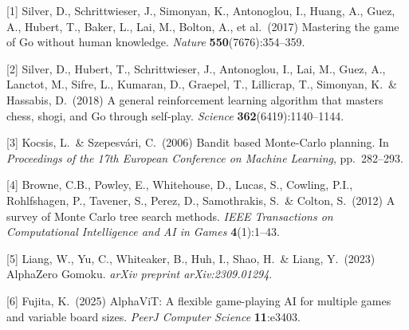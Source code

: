 \documentclass{article}
\begin{document}
{\small

[1] Silver, D., Schrittwieser, J., Simonyan, K., Antonoglou, I., Huang, A., Guez, A., Hubert, T., Baker, L., Lai, M., Bolton, A., et al.\ (2017) Mastering the game of Go without human knowledge. {\it Nature} {\bf 550}(7676):354--359.

[2] Silver, D., Hubert, T., Schrittwieser, J., Antonoglou, I., Lai, M., Guez, A., Lanctot, M., Sifre, L., Kumaran, D., Graepel, T., Lillicrap, T., Simonyan, K.\ \& Hassabis, D.\ (2018) A general reinforcement learning algorithm that masters chess, shogi, and Go through self-play. {\it Science} {\bf 362}(6419):1140--1144.

[3] Kocsis, L.\ \& Szepesv\'ari, C.\ (2006) Bandit based Monte-Carlo planning. In {\it Proceedings of the 17th European Conference on Machine Learning}, pp.\ 282--293.

[4] Browne, C.B., Powley, E., Whitehouse, D., Lucas, S., Cowling, P.I., Rohlfshagen, P., Tavener, S., Perez, D., Samothrakis, S.\ \& Colton, S.\ (2012) A survey of Monte Carlo tree search methods. {\it IEEE Transactions on Computational Intelligence and AI in Games} {\bf 4}(1):1--43.

[5] Liang, W., Yu, C., Whiteaker, B., Huh, I., Shao, H.\ \& Liang, Y.\ (2023) AlphaZero Gomoku. {\it arXiv preprint arXiv:2309.01294}.

[6] Fujita, K.\ (2025) AlphaViT: A flexible game-playing AI for multiple games and variable board sizes. {\it PeerJ Computer Science} {\bf 11}:e3403.
}
\end{document}
